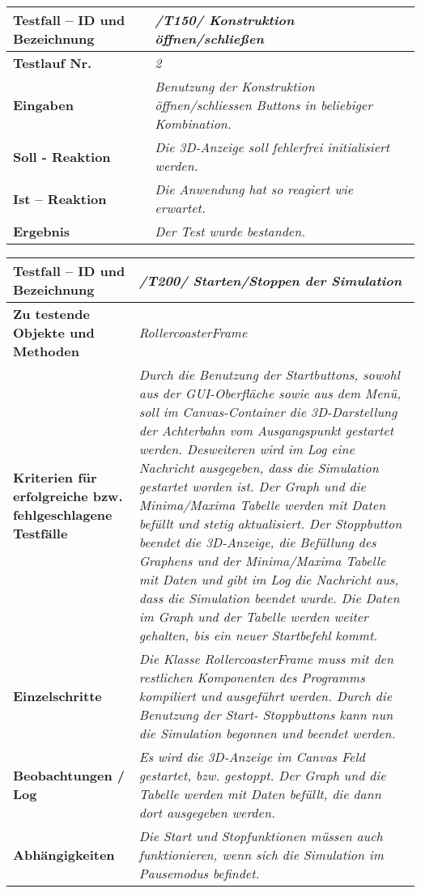 \begin{longtable}{|p{7cm}|p{10cm}|}
\hline
\textbf{Testfall -- ID und Bezeichnung} & \textit{/T150/ Konstruktion öffnen/schließen} \\
\hline
\textbf{Testlauf Nr.} & \textit{2} \\
\hline
\textbf{Eingaben} & \textit{Benutzung der Konstruktion öffnen/schliessen Buttons in beliebiger Kombination.} \\
\hline
\textbf{Soll - Reaktion} & \textit{ Die 3D-Anzeige soll fehlerfrei initialisiert werden.} \\
\hline
\textbf{Ist -- Reaktion} & \textit{ Die Anwendung hat so reagiert wie erwartet.} \\
\hline
\textbf{Ergebnis} & \textit{Der Test wurde bestanden.} \\
\hline
\end{longtable}


\begin{longtable}{|p{7cm}|p{10cm}|}
\hline
\textbf{Testfall -- ID und Bezeichnung} &  \textit{/T200/ Starten/Stoppen der Simulation} \\
\hline
\textbf{Zu testende Objekte und Methoden} &  \textit{RollercoasterFrame}
\\
\hline
\textbf{Kriterien für erfolgreiche bzw. fehlgeschlagene Testfälle} &
\textit{Durch die Benutzung der Startbuttons, sowohl aus der GUI-Oberfläche sowie aus dem Menü, soll im Canvas-Container die 3D-Darstellung der Achterbahn vom Ausgangspunkt gestartet werden.
Desweiteren wird im Log eine Nachricht ausgegeben, dass die Simulation gestartet worden ist. Der Graph und die Minima/Maxima Tabelle werden mit Daten befüllt und stetig aktualisiert.
Der Stoppbutton beendet die 3D-Anzeige, die Befüllung des Graphens und der Minima/Maxima Tabelle mit Daten und gibt im Log die Nachricht aus, dass die Simulation beendet wurde. Die Daten im Graph
und der Tabelle werden weiter gehalten, bis ein neuer Startbefehl kommt.} \\
\hline
\textbf{Einzelschritte} &  \textit{Die Klasse RollercoasterFrame muss mit den restlichen Komponenten des Programms kompiliert und ausgeführt werden. Durch die Benutzung der Start- Stoppbuttons
kann nun die Simulation begonnen und beendet werden.} \\
\hline
\textbf{Beobachtungen / Log} &  \textit{Es wird die 3D-Anzeige im Canvas Feld gestartet, bzw. gestoppt. Der Graph und die Tabelle werden mit Daten befüllt, die dann dort ausgegeben werden.} \\
\hline
\textbf{Abhängigkeiten} &  \textit{Die Start und Stopfunktionen müssen auch funktionieren, wenn sich die Simulation im Pausemodus befindet.} \\
\hline
 \end{longtable}




